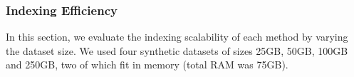 {{%


\subsubsection{\textbf{\color{black}Indexing Efficiency}} %
\label{ssec:indexing_efficiency}
In this section, we evaluate the indexing scalability of each method by varying the dataset size. We used four synthetic datasets of sizes 25GB, 50GB, 100GB and 250GB, two of which fit in memory (total RAM was 75GB).

}}
